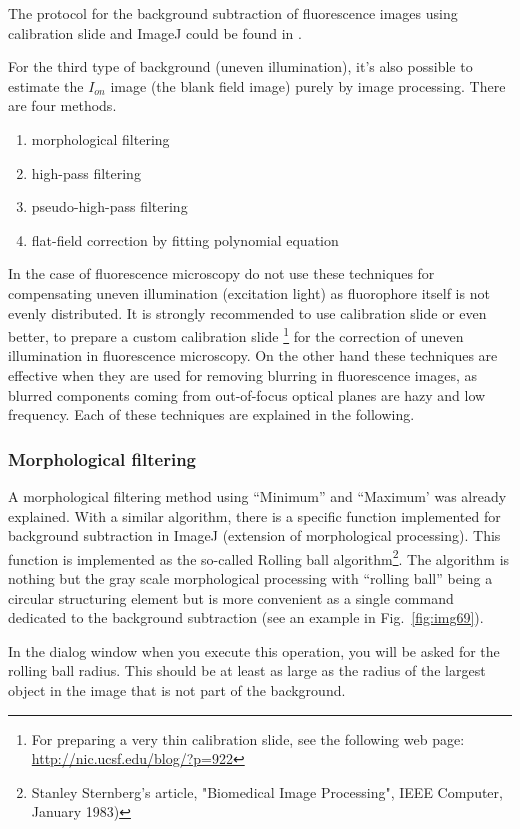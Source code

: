 The protocol for the background subtraction of fluorescence
images using calibration slide and ImageJ could be found in
 \cite{MiuraME2005}.
 
For the third type of background (uneven illumination), it's also possible to estimate the $I_{on}$ image (the blank field image) purely by image processing. There are four methods. 

\begin{enumerate}
\item morphological filtering
\item high-pass filtering
\item pseudo-high-pass filtering
\item flat-field correction by fitting polynomial equation
\end{enumerate}

In the case of fluorescence microscopy do not use these techniques for compensating uneven illumination (excitation light) as fluorophore itself is not evenly distributed. It is strongly recommended to use calibration slide or even better, to prepare a custom calibration slide \footnote{For preparing a very thin calibration slide, see the following web page: \url{http://nic.ucsf.edu/blog/?p=922}} for the correction of uneven illumination in fluorescence microscopy. On the other hand these techniques are effective when they are used for removing blurring in fluorescence images, as blurred components coming from out-of-focus optical planes are hazy and low frequency. Each of these techniques are explained in the following. 

\subsubsection{Morphological filtering}

A morphological filtering method using ``Minimum'' and ``Maximum' was already explained. With a similar algorithm, there is a specific function implemented for
background subtraction in ImageJ (extension of morphological processing). This function is implemented as the so-called Rolling ball algorithm\footnote{
Stanley Sternberg's article, "Biomedical Image Processing", IEEE Computer, January 1983) }. The algorithm is nothing but the gray scale morphological processing with ``rolling ball'' being a circular structuring element but is more convenient as a single command dedicated to the background subtraction (see an example in Fig.~\ref{fig:img69}). 

In the dialog window when you execute this operation, you will be asked for
the rolling ball radius. This should be at least as large as
the radius of the largest object in the image that is not part of the background. 

